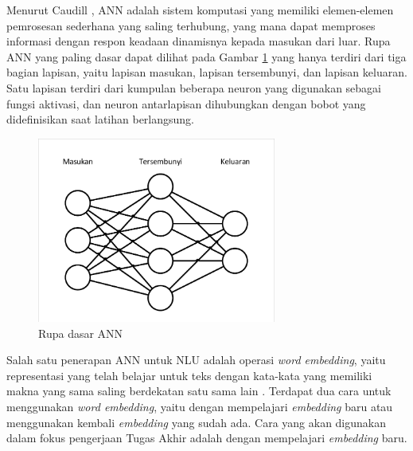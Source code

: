 Menurut Caudill \parencite{caudill1987neural}, ANN adalah sistem komputasi yang memiliki elemen-elemen pemrosesan sederhana yang saling terhubung, yang mana dapat memproses informasi dengan respon keadaan dinamisnya kepada masukan dari luar. Rupa ANN yang paling dasar dapat dilihat pada Gambar \ref{fig:ann} yang hanya terdiri dari tiga bagian lapisan, yaitu lapisan masukan, lapisan tersembunyi, dan lapisan keluaran. Satu lapisan terdiri dari kumpulan beberapa neuron yang digunakan sebagai fungsi aktivasi, dan neuron antarlapisan dihubungkan dengan bobot yang didefinisikan saat latihan berlangsung.
\begin{figure}[ht]
	\centering
	\includegraphics[width=0.7\textwidth, trim=2 2 2 2, clip]{resources/2/ann.pdf}
	\caption{Rupa dasar ANN}
	\label{fig:ann}
\end{figure}

Salah satu penerapan ANN untuk NLU adalah operasi \textit{word embedding}, yaitu representasi yang telah belajar untuk teks dengan kata-kata yang memiliki makna yang sama saling berdekatan satu sama lain \parencite{brownlee2017what}. Terdapat dua cara untuk menggunakan \textit{word embedding}, yaitu dengan mempelajari \textit{embedding} baru atau menggunakan kembali \textit{embedding} yang sudah ada. Cara yang akan digunakan dalam fokus pengerjaan Tugas Akhir adalah dengan mempelajari \textit{embedding} baru.

